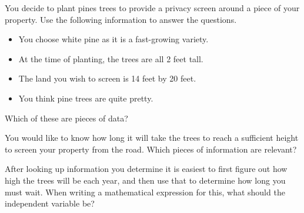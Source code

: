 \documentclass{ximera}
\begin{document}
\begin{problem}
    You decide to plant pines trees to provide a privacy screen around a piece of your property. Use the following information to answer the questions.
    \begin{itemize}
        \item You choose white pine as it is a fast-growing variety.
        \item At the time of planting, the trees are all 2 feet tall.
        \item The land you wish to screen is 14 feet by 20 feet.
        \item You think pine trees are quite pretty.
    \end{itemize}
    Which of these are pieces of data?
    \begin{selectAll}
    \end{selectAll}

    \begin{problem}
        You would like to know how long it will take the trees to reach a sufficient height to screen your property from the road. Which pieces of information are relevant?
        \begin{selectAll}
        \end{selectAll}

        \begin{problem}
            After looking up information you determine it is easiest to first figure out how high the trees will be each year, and then use that to determine how long you must wait. When writing a mathematical expression for this, what should the independent variable be?
            \begin{multipleChoice}
            \end{multipleChoice}


\end{problem}
\end{problem}
\end{problem}
\end{document}
